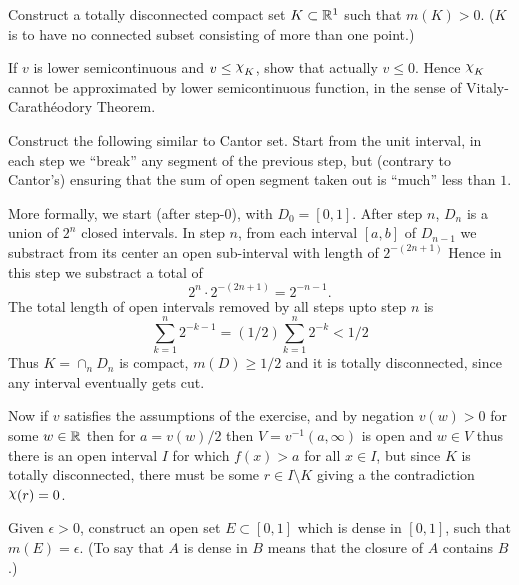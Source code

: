 \begin{enumerate}
\begin{excopy}
Construct \label{ex:disc:K}
a totally disconnected compact set \(K\subset \mathbb{R}^1\) such that
\(m(K) > 0\).
($K$ is to have no connected subset consisting of more than one point.)

If $v$ is lower semicontinuous  and \(v\leq \chhi_K\), show that actually
\(v \leq 0\). Hence \(\chhi_K\) cannot be approximated by lower semicontinuous
function, in the sense of
Vitaly-Carath\'eodory Theorem.
\end{excopy}

Construct the following similar to Cantor set.
Start from the unit interval,
in each step we ``break'' any segment of the previous step,
but (contrary to Cantor's) ensuring that the sum of open segment
taken out is ``much'' less than $1$.

More formally, we start (after step-0), with \(D_0 = [0,1]\).
After step $n$, \(D_n\) is a union of \(2^n\) closed intervals.
In step $n$, from each interval \([a,b]\) of \(D_{n-1}\)
we substract from its center an open sub-interval with length of \(2^{-(2n+1)}\)
Hence in this step we substract a total of
\begin{equation*}
 2^n \cdot 2^{-(2n+1)} = 2^{-n-1}.
\end{equation*}
The total length of open intervals removed by all steps upto step $n$ is
\begin{equation*}
 \sum_{k=1}^n 2^{-k-1} = (1/2) \sum_{k=1}^n 2^{-k} < 1/2
\end{equation*}
Thus \(K = \cap_n D_n\) is compact, \(m(D) \geq 1/2\)
and it is totally disconnected, since any interval eventually gets cut.

Now if $v$ satisfies the assumptions of the exercise, and by negation
\(v(w) > 0\) for some \(w\in \mathbb{R}\) then for \(a = v(w)/2\) then
\(V = v^{-1}(a,\infty)\) is open and \(w\in V\) thus there is an open
interval $I$ for which \(f(x)>a\) for all \(x\in I\),
but since $K$ is totally disconnected, there must be some \(r\in I\setminus K\)
giving a the contradiction \(\chhi(r) = 0\).

\begin{excopy}
Given \(\epsilon > 0\), construct an open set \(E\subset [0,1]\) which is dense
in \([0,1]\), such that \(m(E)=\epsilon\).
(To say that $A$ is dense in $B$ means that the closure of $A$ contains $B$.)
\end{excopy}


\end{enumerate}
